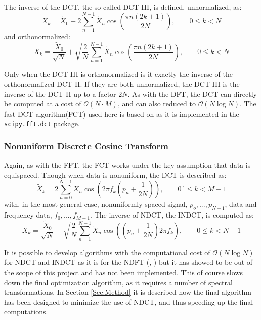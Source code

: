 \documentclass[../../CompleteThesis2/Complete_2ndDraft.tex]{subfiles}
\begin{document}
	The inverse of the DCT, the so called DCT-III, is defined, unnormalized, as: 
	\begin{equation}
		X_k = \tilde{X}_0 + 2\sum_{n=1}^{N-1} \tilde{X}_n\cos\left(\frac{\pi n(2k+1)}{2N}\right), \qquad 0 \leq k < N 
		\label{Eq:IDCT}
	\end{equation}
	and orthonormalized:
	\begin{equation}
		X_k = \frac{\tilde{X}_0}{\sqrt{N}} + \sqrt{\frac{2}{N}}\sum_{n=1}^{N-1} \tilde{X}_n\cos\left(\frac{\pi n(2k+1)}{2N}\right), \qquad 0 \leq k < N 
		\label{Eq:IDCT_ortho}
	\end{equation}
	
	Only when the DCT-III is orthonormalized is it exactly the inverse of the orthonormalized DCT-II. If they are both unnormalized, the DCT-III is the inverse of the DCT-II up to a factor $2N$.
	As with the DFT, the DCT can directly be computed at a cost of $\mathcal{O}(N\cdot M)$, and can also reduced to $\mathcal{O}(N \log N)$. The fast DCT algorithm(FCT) used here is based on \cite{Makhoul1980} as it is implemented in the \lstinline[language=Python]|scipy.fft.dct| package\cite{Virtanen2020_SciPy}.
	
	\subsubsection[NDCT][NDCT]{Nonuniform Discrete Cosine Transform}
	\label{Subsubsec:SignalAnalysis_BackDiffusion_SpectralAnalysis_NDCT}
	Again, as with the FFT, the FCT works under the key assumption that data is equispaced. Though when data is nonuniform, the DCT is described as:
	\begin{equation}
		\tilde{X}_k = 2\sum_{n=0}^{N-1}X_n \cos\left(2\pi f_k\left(p_n + \frac{1}{2N}\right)\right), \qquad 0´ \leq k < M-1
		\label{Eq:NDCT}
	\end{equation}
	with, in the most general case, nonuniformly spaced signal, $p_o,...,p_{N-1}$, data and frequency data, $f_0,...,f_{M-1}$.
	The inverse of NDCT, the INDCT, is computed as:
	\begin{equation}
		X_k = \frac{\tilde{X}_0}{\sqrt{N}} + \sqrt{\frac{2}{N}}\sum_{n=1}^{N-1} \tilde{X}_n \cos\left(\left(p_n + \frac{1}{2N}\right)2\pi f_k\right), \qquad 0 \leq k < N -1
		\label{Eq:INDCT}
	\end{equation}
	
	It is possible to develop algorithms with the computational cost of $\mathcal{O}(N\log N)$ for NDCT and INDCT as it is for 
	the NDFT (\cite{Tian2000}, \cite{Zhao2008}) but it has showed to be out of the scope of this project and has not been implemented. This of course slows down the final optimization algorithm, as it requires a number of spectral transformations. In Section \ref{Sec:Method} it is described how the final algorithm has been designed to minimize the use of NDCT, and thus speeding up the final computations.
	
\end{document}
